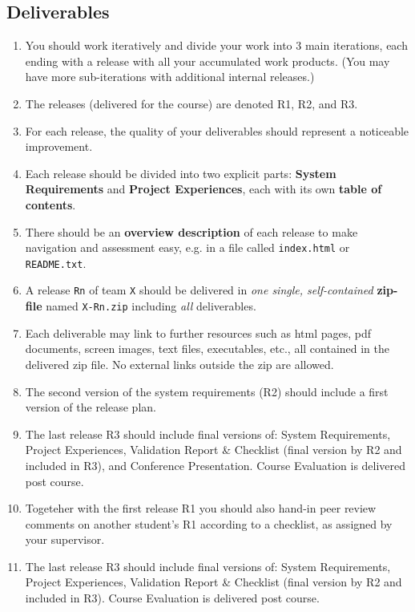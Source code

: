 \subsection{Deliverables}
  \begin{enumerate}[nolistsep]
    \item You should work iteratively and divide your work into 3 main iterations, each ending with a release with all your accumulated work products. (You may have more sub-iterations with additional internal releases.)
    \item The releases (delivered for the course) are denoted R1, R2, and R3.
    \item For each release, the quality of your deliverables should represent a noticeable improvement.
    \item Each release should be divided into two explicit parts: {\bf System Requirements} and {\bf Project Experiences}, each with its own {\bf table of contents}.
    \item There should be an {\bf overview description} of each release to make navigation and assessment easy, e.g. in a file called \verb+index.html+ or \verb+README.txt+.
    \item A release \verb+Rn+ of team \verb+X+ should be delivered in {\it one single, self-contained} {\bf zip-file} named \verb+X-Rn.zip+ including {\it all} deliverables.
    \item Each deliverable may link to further resources such as html pages, pdf documents, screen images, text files, executables, etc., all contained in the delivered zip file. No external links outside the zip are allowed.
\ifteknolog
    \item The second version of the system requirements (R2) should include a first version of the release plan.
    \item The last release R3 should include final versions of: System Requirements, Project Experiences, Validation Report \& Checklist (final version by R2 and included in R3), and Conference Presentation. Course Evaluation is delivered post course.
\else
    \item Togeteher with the first release R1 you should also hand-in peer review comments on another student's R1 according to a checklist, as assigned by your supervisor. 
    \item The last release R3 should include final versions of: System Requirements, Project Experiences, Validation Report \& Checklist (final version by R2 and included in R3). Course Evaluation is delivered post course.
\fi


\end{enumerate}
